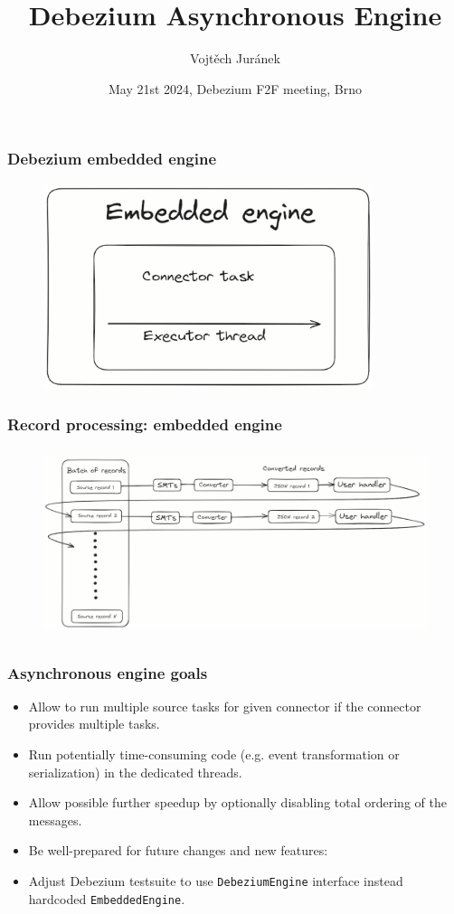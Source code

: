\documentclass[10pt,utf8]{beamer}
\title{Debezium Asynchronous Engine}
\author{Vojtěch Juránek}
\institute[Red Hat]{Red Hat}
\date{May 21st 2024, Debezium F2F meeting, Brno}
\begin{document}
\begin{frame}
    \titlepage
\end{frame}

\begin{frame}
    \frametitle{Debezium embedded engine}
    \begin{figure}
        \centering
        \includegraphics[height=6cm]{./img/embedded_engine.eps}
    \end{figure}
\end{frame}

\begin{frame}
    \frametitle{Record processing:  embedded engine}
    \begin{figure}
        \centering
        \includegraphics[height=5.5cm]{./img/synchronous_processing.eps}
    \end{figure}
\end{frame}

\begin{frame}
    \frametitle{Asynchronous engine goals}
    \begin{itemize}
        \item Allow to run multiple source tasks for given connector if the connector provides multiple tasks.
        \item Run potentially time-consuming code (e.g. event transformation or serialization) in the dedicated threads.
        \item Allow possible further speedup by optionally disabling total ordering of the messages.
        \item Be well-prepared for future changes and new features:
        \item Adjust Debezium testsuite to use \texttt{DebeziumEngine} interface instead hardcoded \texttt{EmbeddedEngine}.
    \end{itemize}
\end{frame}
\end{document}
